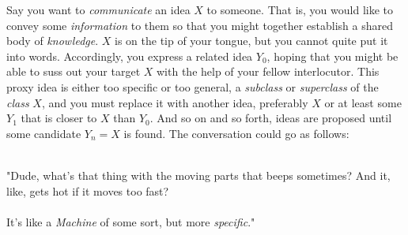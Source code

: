 




Say you want to \textit{communicate} an idea $X$ to someone. That is, you would like to convey some \textit{information} to them so that you might together establish a shared body of \textit{knowledge}. $X$ is on the tip of your tongue, but you cannot quite put it into words. Accordingly, you express a related idea $Y_0$, hoping that you might be able to suss out your target $X$ with the help of your fellow interlocutor. This proxy idea is either too specific or too general, a \textit{subclass} or \textit{superclass} of the \textit{class} $X$, and you must replace it with another idea, preferably $X$ or at least some $Y_1$ that is closer to $X$ than $Y_0$. And so on and so forth, ideas are proposed until some candidate $Y_n=X$ is found. The conversation could go as follows: \\\\

\begin{addmargin}[8em]{2em}
\begin{flushright}
"Dude, what's that thing with the moving parts that beeps sometimes? And it, like, gets hot if it moves too fast? \\[1mm]

\mydots \\[1mm]

It's like a \textit{Machine} of some sort, but more \textit{specific}." \\[\baselineskip]
\end{flushright}
\end{addmargin}

